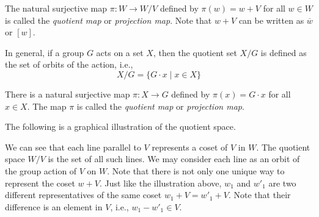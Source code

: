 \documentclass[
	11pt, %
	fleqn, %
	a4paper, %
]{LegrandOrangeBook}
\renewcommand{\bar}[1]{\overline{#1}} %
\newcommand{\quotient}[2]{#1\! / #2} %
\begin{document}
\begin{definition}
    The natural surjective map $\pi : W \to \quotient{W}{V}$ defined by $\pi(w) = w + V$ for all $w \in W$ is called the \emph{quotient map} or \emph{projection map}. Note that $w + V$ can be written as $\bar{w}$ or $[w]$.
\end{definition}

In general, if a group $G$ acts on a set $X$, then the quotient set $\quotient{X}{G}$ is defined as the set of orbits of the action, i.e.,
\[
    \quotient{X}{G} = \{ G \cdot x \mid x \in X \}
\]

There is a natural surjective map $\pi : X \to G$ defined by $\pi(x) = G \cdot x$ for all $x \in X$. The map $\pi$ is called the \emph{quotient map} or \emph{projection map}.

The following is a graphical illustration of the quotient space.

\begin{center}
\end{center}

We can see that each line parallel to $V$ represents a coset of $V$ in $W$. The quotient space $\quotient{W}{V}$ is the set of all such lines. We may consider each line as an orbit of the group action of $V$ on $W$. Note that there is not only one unique way to represent the coset $w + V$. Just like the illustration above, $w_1$ and $w'_1$ are two different representatives of the same coset $w_1 + V = w'_1 + V$. Note that their difference is an element in $V$, i.e., $w_1 - w'_1 \in V$.
\end{document}
